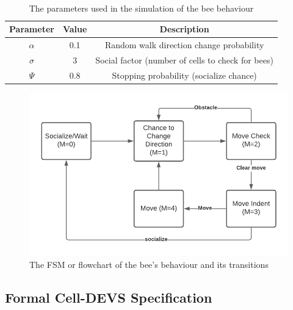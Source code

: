 \documentclass[conference,compsoc,onecolumn]{IEEEtran}
\begin{document}
\begin{center}
	\begin{table}[btp]
		\centering
		\caption{\\The parameters used in the simulation of the bee behaviour \cite{Stefanc2017}}
		\begin{tabular}{ |c|c|c|  }
			\hline
			Parameter & Value & Description \\
			\hline
			\hline
			$\alpha$ & 0.1 & Random walk direction change probability \\
			\hline
			$\sigma$ & 3 & Social factor (number of cells to check for bees) \\
			\hline
			$\Psi$ & 0.8 & Stopping probability (socialize chance) \\
			\hline
		\end{tabular}
		\label{table:sum}
	\end{table}
\end{center}

\begin{figure}[htbp]
	\centerline{\includegraphics[scale=0.85]{../images/bee-flowchart.png}}
	\caption{The FSM or flowchart of the bee's behaviour and its transitions}
	\label{flowchart}
\end{figure}

\subsection{Formal Cell-DEVS Specification}
\end{document}
